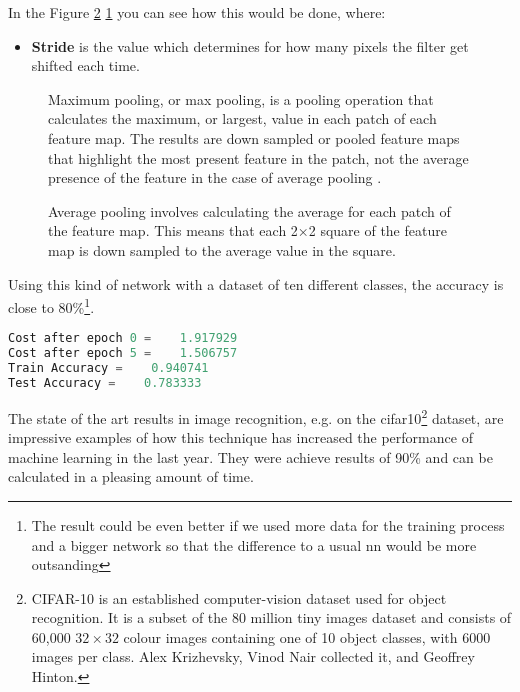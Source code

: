 In the Figure \ref{fig:avg} \ref{fig:max} you can see how this would be done, where:
\begin{itemize}
	\item \textbf{Stride} is the value which determines for how many pixels the filter get shifted each time.
\end{itemize}

\begin{figure}[htp]
	\centering
	\caption{Maximum pooling, or max pooling, is a pooling operation that calculates the maximum, or largest, value in each patch of each feature map. The results are down sampled or pooled feature maps that highlight the most present feature in the patch, not the average presence of the feature in the case of average pooling \cite{}.}
	\label{fig:max}
\end{figure}
\begin{figure}[htp]
	\centering
	\caption{Average pooling involves calculating the average for each patch of the feature map. This means that each 2×2 square of the feature map is down sampled to the average value in the square.}
	\label{fig:avg}
\end{figure}

Using this kind of network with a dataset of ten different classes, the accuracy is close to 80\%\footnote{The result could be even better if we used more data for the training process and a bigger network so that the difference to a usual \Gls{nn} would be more outsanding}.

\begin{lstlisting}[captionpos=b,label={lst:cnn}, float=tb,language=Python, caption=Test accuracy is 80\% after iterations 2400 times and using 209 examples with 12288 features (\(64\times64 \) pixels). That accuracy is not state of the art but very good if considering that this is an algorithm which is not specialized to recognize images.]
Cost after epoch 0 =    1.917929
Cost after epoch 5 =    1.506757
Train Accuracy =    0.940741
Test Accuracy =    0.783333
\end{lstlisting}

The state of the art results in image recognition, e.g. on the cifar10\footnote{CIFAR-10  is an established computer-vision dataset used for object recognition. It is a subset of the 80 million tiny images dataset and consists of 60,000 \( 32 \times 32\) colour images containing one of 10 object classes, with 6000 images per class. Alex Krizhevsky, Vinod Nair collected it, and Geoffrey Hinton.} dataset, are impressive examples of how this technique has increased the performance of machine learning in the last year. They were achieve results of 90\% and can be calculated in a pleasing amount of time.\\

